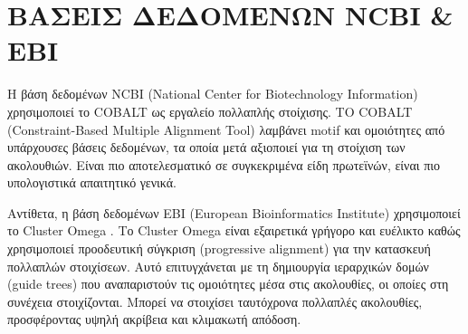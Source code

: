     \section{ΒΑΣΕΙΣ ΔΕΔΟΜΕΝΩΝ NCBI \& EBI}
        Η βάση δεδομένων NCBI (National Center for Biotechnology Information) \cite{NCBI} χρησιμοποιεί το COBALT \cite{COBALT} ως εργαλείο πολλαπλής στοίχισης.
        ΤΟ COBALT (Constraint-Based Multiple Alignment Tool) λαμβάνει motif και ομοιότητες από υπάρχουσες βάσεις δεδομένων, τα οποία μετά αξιοποιεί για τη στοίχιση των ακολουθιών.
        Είναι πιο αποτελεσματικό σε συγκεκριμένα είδη πρωτεϊνών, είναι πιο υπολογιστικά απαιτητικό γενικά.

        Αντίθετα, η βάση δεδομένων EBI \cite{EBI} (European Bioinformatics Institute) χρησιμοποιεί το Cluster Omega \cite{ClusterOmega}.
        Το Cluster Omega είναι εξαιρετικά γρήγορο και ευέλικτο καθώς χρησιμοποιεί προοδευτική σύγκριση (progressive alignment) για την κατασκευή πολλαπλών στοιχίσεων.
        Αυτό επιτυγχάνεται με τη δημιουργία ιεραρχικών δομών (guide trees) που αναπαριστούν τις ομοιότητες μέσα στις ακολουθίες, οι οποίες στη συνέχεια στοιχίζονται.
        Μπορεί να στοιχίσει ταυτόχρονα πολλαπλές ακολουθίες, προσφέροντας υψηλή ακρίβεια και κλιμακωτή απόδοση.